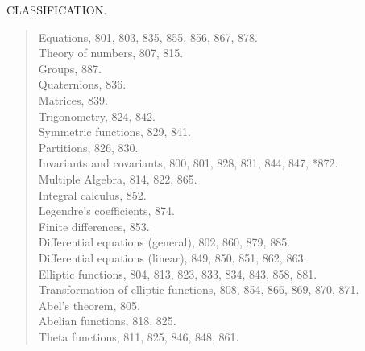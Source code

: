 \documentclass[11pt,a4paper]{article}
\providecommand{\textsc}[1]{{\scshape #1}}
\begin{document}
\thispagestyle{plain}
\vspace*{2em}
\begin{center}
{\Large CLASSIFICATION.}
\end{center}
\vspace{2em}

\noindent\textsc{Analysis.}
\begin{quote}
Equations, 801, 803, 835, 855, 856, 867, 878.\\
Theory of numbers, 807, 815.\\
Groups, 887.\\
Quaternions, 836.\\
Matrices, 839.\\
Trigonometry, 824, 842.\\
Symmetric functions, 829, 841.\\
Partitions, 826, 830.\\
Invariants and covariants, 800, 801, 828, 831, 844, 847, *872.\\
Multiple Algebra, 814, 822, 865.\\
Integral calculus, 852.\\
Legendre's coefficients, 874.\\
Finite differences, 853.\\
Differential equations (general), 802, 860, 879, 885.\\
Differential equations (linear), 849, 850, 851, 862, 863.\\
Elliptic functions, 804, 813, 823, 833, 834, 843, 858, 881.\\
Transformation of elliptic functions, 808, 854, 866, 869, 870, 871.\\
Abel's theorem, 805.\\
Abelian functions, 818, 825.\\
Theta functions, 811, 825, 846, 848, 861.
\end{quote}

\clearpage

\thispagestyle{plain}
\vspace*{1em}
\end{document}
